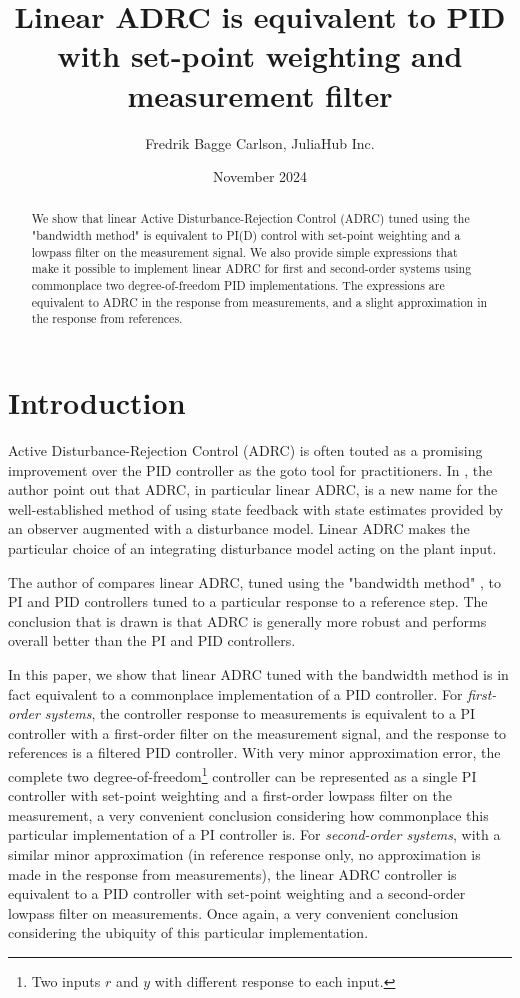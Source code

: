 \documentclass[letterpaper, 10 pt, conference]{ieeeconf}
\title{Linear ADRC is equivalent to PID with set-point weighting and measurement filter}
\author{Fredrik Bagge Carlson, JuliaHub Inc.}
\date{November 2024}
\begin{document}
\maketitle

\begin{abstract}
We show that linear Active Disturbance-Rejection Control (ADRC) tuned using the "bandwidth method" is equivalent to PI(D) control with set-point weighting and a lowpass filter on the measurement signal. We also provide simple expressions that make it possible to implement linear ADRC for first and second-order systems using commonplace two degree-of-freedom PID implementations. The expressions are equivalent to ADRC in the response from measurements, and a slight approximation in the response from references.
\end{abstract}


\section{Introduction}
Active Disturbance-Rejection Control (ADRC) is often touted as a promising improvement over the PID controller as the goto tool for practitioners. In \cite{herbst2013simulative}, the author point out that ADRC, in particular linear ADRC, is a new name for the well-established method of using state feedback with state estimates provided by an observer augmented with a disturbance model. Linear ADRC makes the particular choice of an integrating disturbance model acting on the plant input. 

The author of \cite{herbst2013simulative} compares linear ADRC, tuned using the "bandwidth method" \cite{gao2003scaling}, to PI and PID controllers tuned to a particular response to a reference step. The conclusion that is drawn is that ADRC is generally more robust and performs overall better than the PI and PID controllers.

In this paper, we show that linear ADRC tuned with the bandwidth method is in fact equivalent to a commonplace implementation of a PID controller. For \emph{first-order systems}, the controller response to measurements is equivalent to a PI controller with a first-order filter on the measurement signal, and the response to references is a filtered PID controller. With very minor approximation error, the complete two degree-of-freedom\footnote{Two inputs $r$ and $y$ with different response to each input.} controller can be represented as a single PI controller with set-point weighting and a first-order lowpass filter on the measurement, a very convenient conclusion considering how commonplace this particular implementation of a PI controller is. For \emph{second-order systems}, with a similar minor approximation (in reference response only, no approximation is made in the response from measurements), the linear ADRC controller is equivalent to a PID controller with set-point weighting and a second-order lowpass filter on measurements. Once again, a very convenient conclusion considering the ubiquity of this particular implementation.
\end{document}
